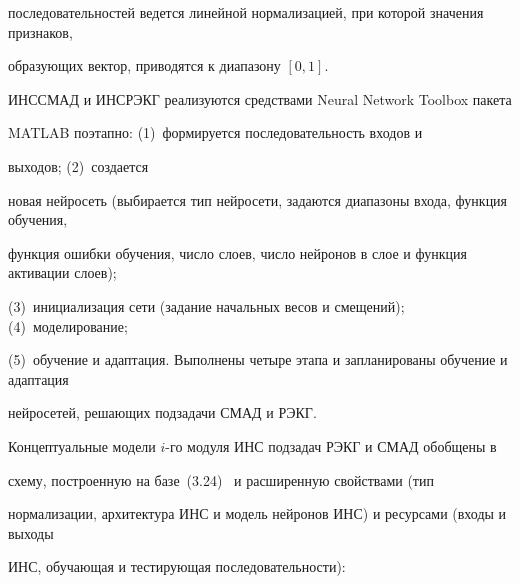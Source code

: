 последовательностей ведется линейной нормализацией, при которой значения признаков,


образующих вектор, приводятся к диапазону $[0, 1]$.





 ИНССМАД и ИНСРЭКГ реализуются средствами Neural Network Toolbox пакета


MATLAB поэтапно: (1)~формируется последовательность входов и\linebreak


\vspace*{-14pt}


\pagebreak





\noindent


выходов; (2)~создается


новая нейросеть (выбирается тип нейросети, задаются диапазоны входа, функция обучения,


функция ошибки обучения, число слоев, число нейронов в слое и функция активации слоев);


(3)~инициализация сети (задание начальных весов и смещений); (4)~моделирование;


(5)~обучение и адаптация. Выполнены четыре этапа и запланированы обучение и адаптация


нейросетей, решающих подзадачи СМАД и РЭКГ.





 Концептуальные модели $i$-го модуля ИНС подзадач РЭКГ и СМАД обобщены в


схему, построенную на базе~(3.24)~\cite{2-kir} и расширенную свойствами (тип


нормализации, архитектура ИНС и модель нейронов ИНС) и ресурсами (входы и выходы


ИНС, обучающая и тестирующая последовательности):



